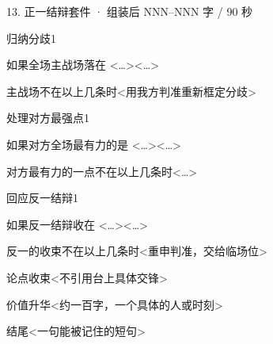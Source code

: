 \documentclass[script,pro]{debate}   %
\begin{document}
\begin{kit}{13. 正一结辩}{套件 · 组装后 NNN–NNN 字 / 90 秒}
\begin{pick}{归纳分歧}{1}
\begin{module}{如果全场主战场落在 <…>}<…>\end{module}
\begin{fallback}{主战场不在以上几条时}<用我方判准重新框定分歧>\end{fallback}
\end{pick}
\begin{pick}{处理对方最强点}{1}
\begin{module}{如果对方全场最有力的是 <…>}<…>\end{module}
\begin{fallback}{对方最有力的一点不在以上几条时}<…>\end{fallback}
\end{pick}
\begin{pick}{回应反一结辩}{1}
\begin{module}{如果反一结辩收在 <…>}<…>\end{module}
\begin{fallback}{反一的收束不在以上几条时}<重申判准，交给临场位>\end{fallback}
\end{pick}
\begin{fixed}{论点收束}<不引用台上具体交锋>\end{fixed}
\begin{fixed}{价值升华}<约一百字，一个具体的人或时刻>\end{fixed}
\begin{fixed}{结尾}<一句能被记住的短句>\end{fixed}
\end{kit}
\end{document}
